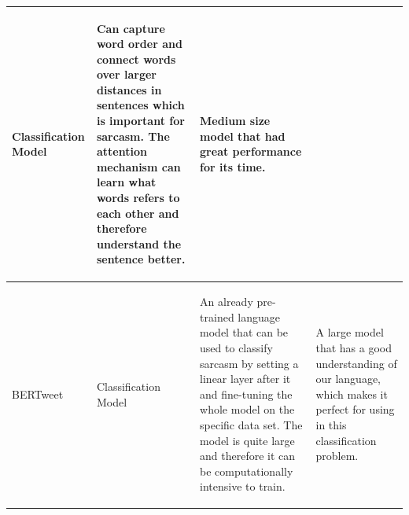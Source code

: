 \documentclass[
 reprint,
 amsmath,amssymb,
 aps,
]{revtex4-2}
\begin{document}
\begin{center}
\begin{tabular}{| l | l | l | l |}
		\parbox{2.8cm}{\begin{flushleft}
				               Classification Model
			               \end{flushleft}}
		\hspace{0.1cm} &
		\hspace{0.1cm}
		\parbox{5.5cm}{\begin{flushleft}
				               Can capture word order and connect words over larger distances in sentences which is important for sarcasm. The attention mechanism can learn what words refers to each other and therefore understand the sentence better.
			               \end{flushleft}}
		\hspace{0.1cm}
		               &
		\hspace{0.1cm}
		\parbox{5.5cm}{\begin{flushleft}
				               Medium size model that had great performance for its time.
			               \end{flushleft}}
		\hspace{0.1cm}
		\\
		\hline
		\hspace{0.1cm}
		\parbox{1.8cm}{\begin{flushleft}
				               BERTweet
			               \end{flushleft}}
		\hspace{0.1cm}
		               &
		\hspace{0.1cm}
		\parbox{2.8cm}{\begin{flushleft}
				               Classification Model
			               \end{flushleft}}
		\hspace{0.1cm} &
		\hspace{0.1cm}
		\parbox{5.5cm}{\begin{flushleft}
				               An already pre-trained language model that can be used to classify sarcasm by setting a linear layer after it and fine-tuning the whole model on the specific data set. The model is quite large and therefore it can be computationally intensive to train.
			               \end{flushleft}}
		\hspace{0.1cm}
		               &
		\hspace{0.1cm}
		\parbox{5.5cm}{\begin{flushleft}
				               A large model that has a good understanding of our language, which makes it perfect for using in this classification problem.

			               \end{flushleft}}
		\hspace{0.1cm}
		\\
		\hline
	\end{tabular}
\end{center}
\twocolumngrid
\end{document}
